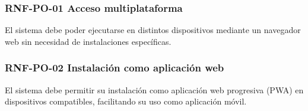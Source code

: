 \vspace{-0.75em}
\subsubsection{RNF-PO-01 Acceso multiplataforma}
\vspace{-1em}

El sistema debe poder ejecutarse en distintos dispositivos mediante un navegador web sin necesidad de instalaciones específicas.

\vspace{-0.75em}
\subsubsection{RNF-PO-02 Instalación como aplicación web}
\vspace{-1em}

El sistema debe permitir su instalación como aplicación web progresiva (PWA) en dispositivos compatibles, facilitando su uso como aplicación móvil.

